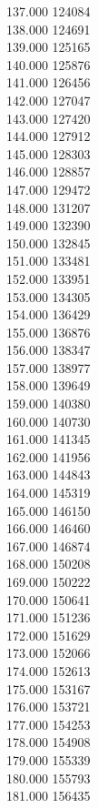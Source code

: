 { 137.000	124084 \\
 138.000	124691 \\
 139.000	125165 \\
 140.000	125876 \\
 141.000	126456 \\
 142.000	127047 \\
 143.000	127420 \\
 144.000	127912 \\
 145.000	128303 \\
 146.000	128857 \\
 147.000	129472 \\
 148.000	131207 \\
 149.000	132390 \\
 150.000	132845 \\
 151.000	133481 \\
 152.000	133951 \\
 153.000	134305 \\
 154.000	136429 \\
 155.000	136876 \\
 156.000	138347 \\
 157.000	138977 \\
 158.000	139649 \\
 159.000	140380 \\
 160.000	140730 \\
 161.000	141345 \\
 162.000	141956 \\
 163.000	144843 \\
 164.000	145319 \\
 165.000	146150 \\
 166.000	146460 \\
 167.000	146874 \\
 168.000	150208 \\
 169.000	150222 \\
 170.000	150641 \\
 171.000	151236 \\
 172.000	151629 \\
 173.000	152066 \\
 174.000	152613 \\
 175.000	153167 \\
 176.000	153721 \\
 177.000	154253 \\
 178.000	154908 \\
 179.000	155339 \\
 180.000	155793 \\
 181.000	156435 \\
}
